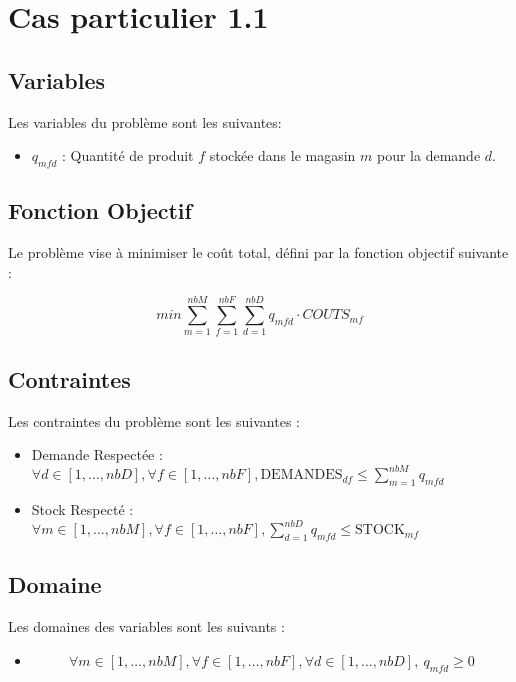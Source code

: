 

\section{Cas particulier 1.1}

\subsection{Variables}

Les variables du problème sont les suivantes:

\begin{itemize}
    \item $q_{mfd}$ : Quantité de produit $f$ stockée dans le magasin $m$ pour la demande $d$.
\end{itemize}

\subsection{Fonction Objectif}

Le problème vise à minimiser le coût total, défini par la fonction objectif suivante :

\[
min \sum_{m=1}^{nbM} \sum_{f=1}^{nbF} \sum_{d=1}^{nbD} q_{mfd} \cdot COUTS_{mf}
\]

\subsection{Contraintes}

Les contraintes du problème sont les suivantes :

\begin{itemize}
    \item Demande Respectée : $\forall d \in [1, \ldots, nbD], \forall f \in [1, \ldots, nbF], \text{DEMANDES}_{df} \leq \sum\limits_{m=1}^{nbM} q_{mfd}$
    \item Stock Respecté : $\forall m \in [1, \ldots, nbM], \forall f \in [1, \ldots, nbF], \sum\limits_{d=1}^{nbD} q_{mfd} \leq \text{STOCK}_{mf}$
\end{itemize}

\subsection{Domaine}

Les domaines des variables sont les suivants :

\begin{itemize}
\item \[\forall m \in [1, \ldots, nbM], \forall f \in [1, \ldots, nbF], \forall d \in [1, \ldots, nbD] ,\ q_{mfd} \geq 0
\]
\end{itemize}

